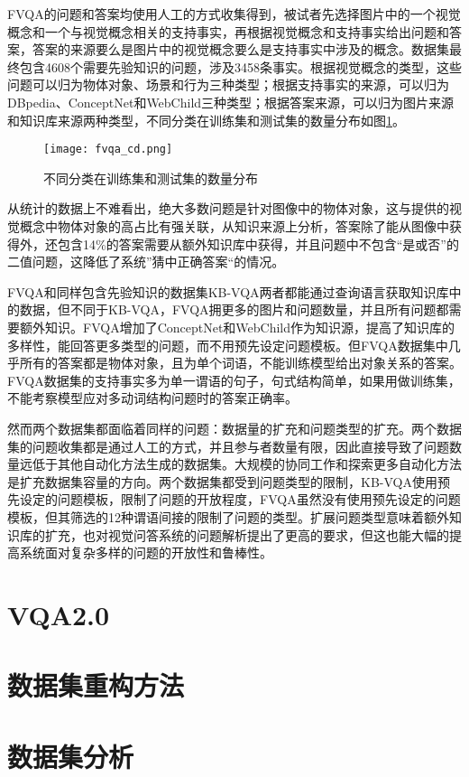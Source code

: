 FVQA的问题和答案均使用人工的方式收集得到，被试者先选择图片中的一个视觉概念和一个与视觉概念相关的支持事实，再根据视觉概念和支持事实给出问题和答案，答案的来源要么是图片中的视觉概念要么是支持事实中涉及的概念。数据集最终包含4608个需要先验知识的问题，涉及3458条事实。根据视觉概念的类型，这些问题可以归为物体对象、场景和行为三种类型；根据支持事实的来源，可以归为DBpedia、ConceptNet和WebChild三种类型；根据答案来源，可以归为图片来源和知识库来源两种类型，不同分类在训练集和测试集的数量分布如图\ref{fvqa_cd}。
\begin{figure}[H]
	\centering
	\texttt{[image: fvqa\_cd.png]}
	\caption{不同分类在训练集和测试集的数量分布}
	\label{fvqa_cd}
\end{figure}

从统计的数据上不难看出，绝大多数问题是针对图像中的物体对象，这与提供的视觉概念中物体对象的高占比有强关联，从知识来源上分析，答案除了能从图像中获得外，还包含14\%的答案需要从额外知识库中获得，并且问题中不包含“是或否”的二值问题，这降低了系统”猜中正确答案“的情况。

FVQA和同样包含先验知识的数据集KB-VQA两者都能通过查询语言获取知识库中的数据，但不同于KB-VQA，FVQA拥更多的图片和问题数量，并且所有问题都需要额外知识。FVQA增加了ConceptNet和WebChild作为知识源，提高了知识库的多样性，能回答更多类型的问题，而不用预先设定问题模板。但FVQA数据集中几乎所有的答案都是物体对象，且为单个词语，不能训练模型给出对象关系的答案。FVQA数据集的支持事实多为单一谓语的句子，句式结构简单，如果用做训练集，不能考察模型应对多动词结构问题时的答案正确率。

然而两个数据集都面临着同样的问题：数据量的扩充和问题类型的扩充。两个数据集的问题收集都是通过人工的方式，并且参与者数量有限，因此直接导致了问题数量远低于其他自动化方法生成的数据集。大规模的协同工作和探索更多自动化方法是扩充数据集容量的方向。两个数据集都受到问题类型的限制，KB-VQA使用预先设定的问题模板，限制了问题的开放程度，FVQA虽然没有使用预先设定的问题模板，但其筛选的12种谓语间接的限制了问题的类型。扩展问题类型意味着额外知识库的扩充，也对视觉问答系统的问题解析提出了更高的要求，但这也能大幅的提高系统面对复杂多样的问题的开放性和鲁棒性。

\section{VQA2.0}

\section{数据集重构方法}

\section{数据集分析}
